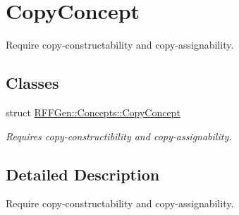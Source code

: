 \hypertarget{group__CopyConcept}{\section{Copy\-Concept}
\label{group__CopyConcept}
}


Require copy-\/constructability and copy-\/assignability.  


\subsection*{Classes}
\begin{DoxyCompactItemize}
\item 
struct \hyperlink{structRFFGen_1_1Concepts_1_1CopyConcept}{R\-F\-F\-Gen\-::\-Concepts\-::\-Copy\-Concept}
\begin{DoxyCompactList}\small\item\em Requires copy-\/constructibility and copy-\/assignability. \end{DoxyCompactList}\end{DoxyCompactItemize}


\subsection{Detailed Description}
Require copy-\/constructability and copy-\/assignability. 